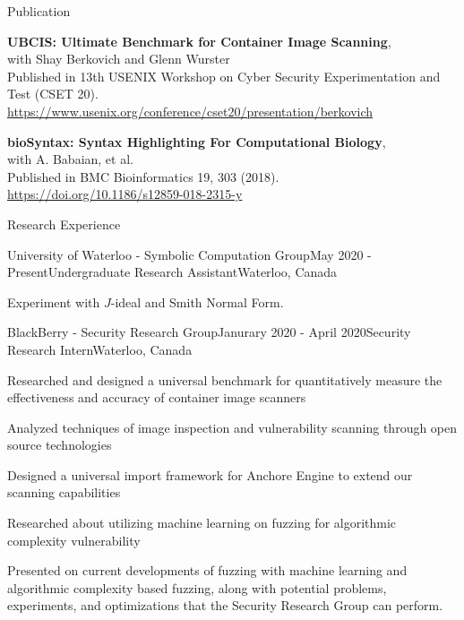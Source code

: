 \documentclass{cv}
\begin{document}
\begin{rSection}{Publication}
\begin{rSubsectionPure}
	\item \textbf{{UBCIS}: Ultimate Benchmark for Container Image Scanning}, \\
	with Shay Berkovich and Glenn Wurster \\
	Published in 13th {USENIX} Workshop on Cyber Security Experimentation and Test ({CSET} 20). \\
	\href{https://www.usenix.org/conference/cset20/presentation/berkovich}{https://www.usenix.org/conference/cset20/presentation/berkovich}
\end{rSubsectionPure}

\begin{rSubsectionPure}
	\item \textbf{bioSyntax: Syntax Highlighting For Computational Biology}, \\
	with A. Babaian, et al. \\
	Published in BMC Bioinformatics 19, 303 (2018). \\
	\href{https://doi.org/10.1186/s12859-018-2315-y}{https://doi.org/10.1186/s12859-018-2315-y}
\end{rSubsectionPure}
\end{rSection}

\begin{rSection}{Research Experience}
\begin{rSubsection}{University of Waterloo - Symbolic Computation Group}{May 2020 - Present}{Undergraduate Research Assistant}{Waterloo, Canada}
	\item Experiment with $J$-ideal and Smith Normal Form.
\end{rSubsection}

\begin{rSubsection}{BlackBerry - Security Research Group}{Janurary 2020 - April 2020}{Security Research Intern}{Waterloo, Canada}
	\item Researched and designed a universal benchmark for quantitatively measure the effectiveness and accuracy of container image scanners
	\item Analyzed techniques of image inspection and vulnerability scanning through open source technologies
	\item Designed a universal import framework for Anchore Engine to extend our scanning capabilities
  	\item Researched about utilizing machine learning on fuzzing for algorithmic complexity vulnerability
  	\item Presented on current developments of fuzzing with machine learning and algorithmic complexity based fuzzing, along with potential problems, experiments, and optimizations that the Security Research Group can perform.
\end{rSubsection}
\end{rSection}
\end{document}
